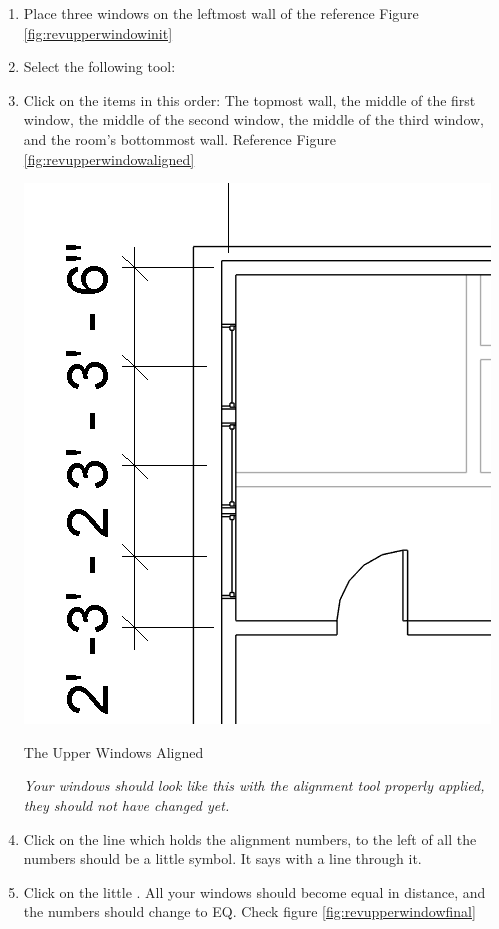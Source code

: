 \documentclass{tufte-book} %
\begin{document}
\begin{enumerate}
		\item Place three windows on the leftmost wall of the  reference Figure \ref{fig:revupperwindowinit}
		\item Select the following tool: 
		\item Click on the items in this order: The topmost wall, the middle of the first window, the middle of the second window, the middle of the third window, and the room's bottommost wall. Reference Figure \ref{fig:revupperwindowaligned}
		
		\begin{marginfigure}
			\includegraphics[width=\linewidth]{revitupperwindowaligned.png}
			\caption{The Upper Windows Aligned}
			\emph{Your windows should look like this with the alignment tool properly applied, they should not have changed yet.}
			\label{fig:revupperwindowaligned}
		\end{marginfigure}
		
		\item Click on the line which holds the alignment numbers, to the left of all the numbers should be a little symbol. It says  with a line through it.
		\item Click on the little . All your windows should become equal in distance, and the numbers should change to EQ. Check figure \ref{fig:revupperwindowfinal}
		

\end{enumerate}
\end{document}
